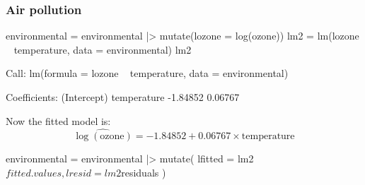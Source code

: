 \documentclass[a4paper]{article}\usepackage[]{graphicx}\usepackage[]{xcolor}
\begin{document}
\subsubsection{Air pollution}
\begin{Schunk}
\begin{Sinput}
environmental = environmental |> 
  mutate(lozone = log(ozone))
lm2 = lm(lozone ~ temperature, data = environmental)
lm2
\end{Sinput}
\begin{Soutput}

Call:
lm(formula = lozone ~ temperature, data = environmental)

Coefficients:
(Intercept)  temperature  
   -1.84852      0.06767  
\end{Soutput}
\end{Schunk}
Now the fitted model is:
\[
	\widehat{\log(\text{ozone})} = -1.84852 + 0.06767\times\text{temperature}
\]
\begin{Schunk}
\begin{Sinput}
environmental = environmental |> 
  mutate(
    lfitted = lm2$fitted.values,
    lresid = lm2$residuals
  )
\end{Sinput}
\end{Schunk}
\end{document}
